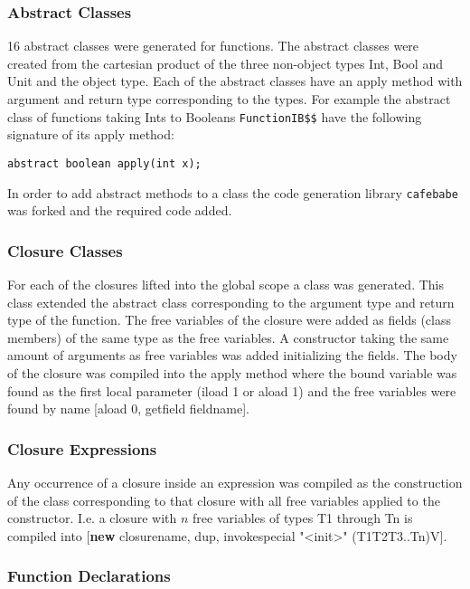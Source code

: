 \subsubsection{Abstract Classes}
16 abstract classes were generated for functions. The abstract classes
were created from the cartesian product of the three non-object types Int, Bool and Unit and the object type. Each of the abstract classes have an
apply method with argument and return type corresponding to the types. For example the abstract class of functions taking Ints to Booleans \texttt{FunctionIB\$\$} have the following signature of its apply method:
\begin{lstlisting}
abstract boolean apply(int x);
\end{lstlisting}
In order to add abstract methods to a class the code generation library \texttt{cafebabe} was forked and the required code added.

\subsubsection{Closure Classes}\label{sec:closure-classes}
For each of the closures lifted into the global scope a class was generated. This class extended the abstract class corresponding to the
argument type and return type of the function. The free variables of the
closure were added as fields (class members) of the same type as the free variables. A constructor taking
the same amount of arguments as free variables was added initializing the
fields. The body of the closure was compiled into the apply method where
the bound variable was found as the first local parameter (iload 1 or aload 1) and the free variables were found by name [aload 0, getfield fieldname].

\subsubsection{Closure Expressions}
Any occurrence of a closure inside an expression was compiled as the construction of the class corresponding to that closure with all free
variables applied to the constructor. I.e. a closure with $n$ free variables of types T1 through Tn is compiled into [\textbf{new} closurename, dup, invokespecial "<init>" (T1T2T3..Tn)V].

\subsubsection{Function Declarations}

